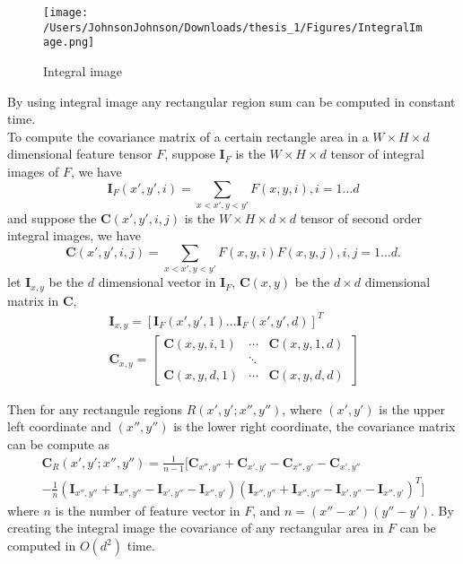 \begin{figure}[H]
\centering
\texttt{[image: /Users/JohnsonJohnson/Downloads/thesis\_1/Figures/IntegralImage.png]}
\caption{Integral image}
\vspace{0em}
\end{figure} 
By using integral image any rectangular region sum can be computed in constant time. \\
\indent To compute the covariance matrix of a certain rectangle area in a $W\times H\times d$ dimensional feature tensor $F$, suppose $\bm{I}_F$ is the $W\times H\times d$ tensor of integral images of $F$, we have 
\begin{equation}
 \bm{I}_F(x', y', i) = \sum_{x < x', y < y'}F(x, y ,i), i = 1 \dots d
\end{equation} 
and suppose the $\bm{C}(x', y', i, j)$ is the $W\times H\times d\times d$ tensor of second order integral images, we have
\begin{equation}
\bm{C}(x', y', i, j) = \sum_{x<x', y<y'} F(x, y, i)F(x, y, j), i, j = 1 \dots d.
\end{equation}
let $\bm{I}_{x, y}$ be the $d$ dimensional vector in $\bm{I}_F$, $\bm{C}(x, y)$ be the $d\times d$ dimensional matrix in $\bm{C}$, 
\begin{equation}
\begin{aligned}
\bm{I}_{x, y} = [ \bm{I}_F(x', y', 1) \dots  \bm{I}_F(x', y', d)]^T \\
 \bm{C}_{x, y} = \left [
 \begin{matrix} 
 \bm{C}(x, y, i, 1)  &\cdots & \bm{C}(x, y, 1, d)\\
 			     & \ddots &			        \\
\bm{C}(x, y, d, 1)   & \cdots &\bm{C}(x, y, d, d)
 
 \end{matrix} \right ]
 \end{aligned}
\end{equation}

Then for any rectangule regions $R(x', y'; x'', y'')$, where $(x', y')$ is the upper left coordinate and $(x'', y'')$ is the lower right coordinate, the covariance matrix can be compute as 
\begin{equation}
\begin{aligned}
\bm{C}_R(x', y'; x'', y'') = \frac{1}{n-1} [\bm{C}_{x'', y''} + \bm{C}_{x', y'} -  \bm{C}_{x'', y'}-  \bm{C}_{x', y''} \\
-\frac{1}{n}(\bm{I}_{x'', y''} + \bm{I}_{x'', y''} - \bm{I}_{x', y''} - \bm{I}_{x'', y'})(\bm{I}_{x'', y''} + \bm{I}_{x'', y''} - \bm{I}_{x', y''} - \bm{I}_{x'', y'})^T]
\end{aligned}
\end{equation}
where $n$ is the number of feature vector in $F$, and $n = (x'' - x')(y'' - y')$. By creating the integral image the covariance of any rectangular area in $F$ can be computed in $O(d^2)$ time.

